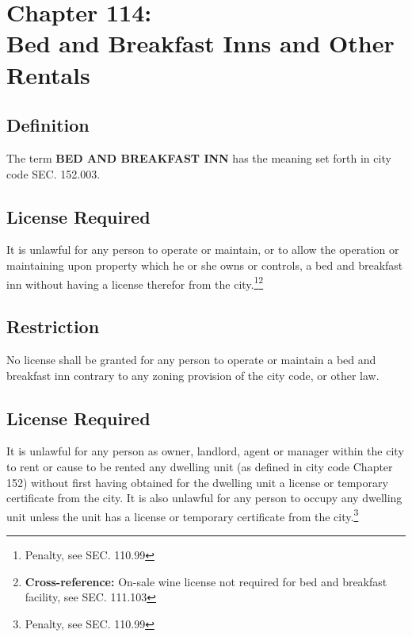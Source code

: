 \chapter*{Chapter 114: \\
	Bed and Breakfast Inns and Other Rentals}
    \vfill
    \minitoc
    \pagebreak


\section{Definition}
The term \textbf{BED AND BREAKFAST INN} has the meaning set forth in city code SEC. 152.003.

\section{License Required}
It is unlawful for any person to operate or maintain, or to allow the operation or maintaining upon property which he or she owns or controls, a bed and breakfast inn without having a license therefor from the city.\footnote{Penalty, see SEC. 110.99}\footnote{\textbf{Cross-reference:} On-sale wine license not required for bed and breakfast facility, see SEC. 111.103}

\section{Restriction}
No license shall be granted for any person to operate or maintain a bed and breakfast inn contrary to any zoning provision of the city code, or other law.


\setcounter{section}{14}
\section{License Required}
It is unlawful for any person as owner, landlord, agent or manager within the city to rent or cause to be rented any dwelling unit (as defined in city code Chapter 152) without first having obtained for the dwelling unit a license or temporary certificate from the city. It is also unlawful for any person to occupy any dwelling unit unless the unit has a license or temporary certificate from the city.\footnote{Penalty, see SEC. 110.99}

